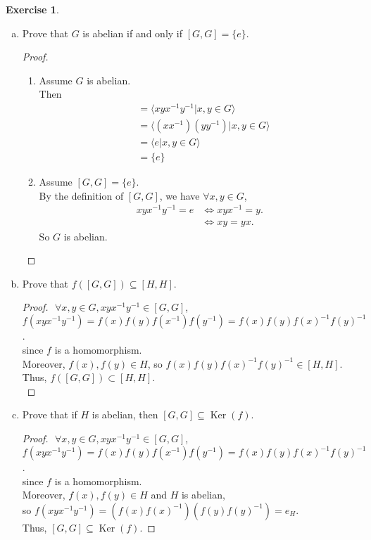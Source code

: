 \documentclass{amsart}
\renewcommand{\ker}{\operatorname{Ker}}
\theoremstyle{plain}
\theoremstyle{definition}
\newtheorem{exer}[lem]{Exercise}
\begin{document}
\begin{exer}
\begin{enumerate}[(a)]
\item Prove that $G$ is abelian if and only if $[G,G]=\{e\}$.
	\begin{proof}
		$ $\newline
		\begin{enumerate}
			\item 
				Assume $G$ is abelian.\\
				Then 
				\begin{align*}
				[G,G] &= \langle xyx^{-1}y^{-1} |x,y \in G\rangle \\
			    	  &= \langle (xx^{-1})(yy^{-1}) |x,y \in G \rangle \\
			    	  &= \langle e |x,y \in G \rangle \\
			    	  & = \{e\}
				\end{align*}	
			\item
				Assume $[G,G] = \{e\}$.\\ 
				By the definition of $[G,G]$, we have 
				$\forall x,y \in G$,
				\begin{align*}
					xyx^{-1}y^{-1} = e  & \Longleftrightarrow xyx^{-1} = y. \\
										& \Longleftrightarrow xy = yx. 
				\end{align*}
				So $G$ is abelian.
		\end{enumerate}
	\end{proof}
\item Prove that $f([G,G])\subseteq[H,H]$.
	\begin{proof}
		$ $\newline
		$\forall x,y \in G, xyx^{-1}y^{-1} \in [G,G]$,\\
		$f(xyx^{-1}y^{-1}) = f(x)f(y)f(x^{-1})f(y^{-1}) = f(x)f(y){f(x)}^{-1}{f(y)}^{-1}$. \\
		since $f$ is a homomorphism.\\
		Moreover, $f(x), f(y) \in H$, so $f(x)f(y){f(x)}^{-1}{f(y)}^{-1} \in [H,H]$.\\
		Thus, $f([G,G]) \subset [H,H]$.\\
	\end{proof}
\item Prove that if $H$ is abelian, then $[G,G]\subseteq\ker(f)$.
	\begin{proof}
		$ $\newline
		$\forall x,y \in G, xyx^{-1}y^{-1} \in [G,G]$,\\
		$f(xyx^{-1}y^{-1}) = f(x)f(y)f(x^{-1})f(y^{-1}) = f(x)f(y){f(x)}^{-1}{f(y)}^{-1}$. \\
		since $f$ is a homomorphism.\\
		Moreover, $f(x), f(y) \in H$ and $H$ is abelian, \\
		so $f(xyx^{-1}y^{-1}) = (f(x){f(x)}^{-1})(f(y){f(y)}^{-1}) = e_H$.\\
		Thus, $[G,G]\subseteq\ker(f)$.
	\end{proof}
\end{enumerate}
\end{exer}
\end{document}
